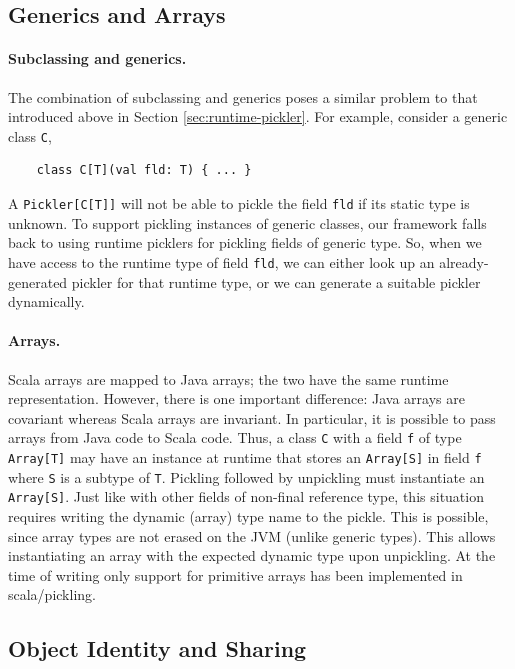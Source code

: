 \documentclass[10pt]{sigplanconf}
\theoremstyle{definition}
\theoremstyle{definition}
\newcommand{\term}[1]{\mbox{\texttt{#1}}}
\begin{document}
\subsection{Generics and Arrays}

\paragraph{Subclassing and generics.} The combination of subclassing and generics
poses a similar problem to that introduced above in Section \ref{sec:runtime-pickler}.
For example, consider a generic class \term{C},

\begin{lstlisting}
    class C[T](val fld: T) { ... }
\end{lstlisting}

A \term{Pickler[C[T]]} will not be able to pickle the field \term{fld} if its
static type is unknown. To support pickling instances of generic classes, our
framework falls back to using runtime picklers for pickling fields of generic
type. So, when we have access to the runtime type of field \term{fld}, we can
either look up an already-generated pickler for that runtime type, or we can
generate a suitable pickler dynamically.

\paragraph{Arrays.} Scala arrays are mapped to Java arrays;  the two have the
same runtime representation. However, there is one important difference: Java
arrays are covariant whereas Scala arrays are invariant. In particular, it is
possible to pass arrays from Java code to Scala code. Thus, a class \verb|C|
with a field \verb|f| of type \verb|Array[T]| may have an instance at runtime
that stores an \verb|Array[S]| in field \verb|f| where \verb|S| is a subtype
of \verb|T|. Pickling followed by unpickling must instantiate an
\verb|Array[S]|. Just like with other fields of non-final reference type, this
situation requires writing the dynamic (array) type name to the pickle. This
is possible, since array types are not erased on the JVM (unlike generic
types). This allows instantiating an array with the expected dynamic type upon
unpickling. At the time of writing only support for primitive arrays has been
implemented in scala/pickling.


\subsection{Object Identity and Sharing}
\label{sec:object-identity}
\end{document}
